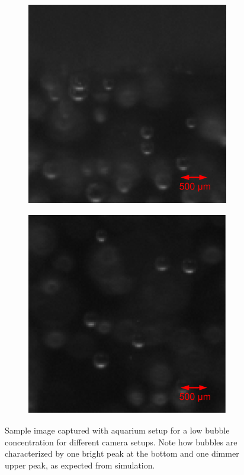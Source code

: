 \begin{figure}[h]
			\begin{subfigure}[t]{.4\textwidth}
				\centering
				\includegraphics[scale=0.5]{images/aq_result_surf_small_1.png}				
				\caption{}
				\label{subfig:low_c}				
			\end{subfigure}\hfill
			\begin{subfigure}[t]{.4\textwidth}
				\centering
				\includegraphics[scale=0.5]{images/aq_result_surf_small_2.png}
				\caption{}
				\label{subfig:low_d}				
			\end{subfigure}\hfill			
			\caption{Sample image captured with aquarium setup for a low bubble concentration for different camera setups. Note how bubbles are characterized by one bright peak at the bottom and one dimmer upper peak, as expected from simulation.}			
			\label{fig:aqauarium_result}
		\end{figure}
					

